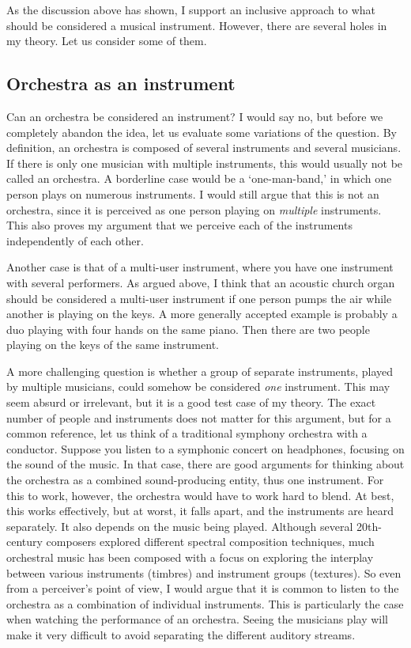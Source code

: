 As the discussion above has shown, I support an inclusive approach to what should be considered a musical instrument. However, there are several holes in my theory. Let us consider some of them.


\subsection{Orchestra as an instrument}\label{sec:orchestra}

Can an orchestra be considered an instrument? I would say no, but before we completely abandon the idea, let us evaluate some variations of the question. By definition, an orchestra is composed of several instruments and several musicians. If there is only one musician with multiple instruments, this would usually not be called an orchestra. A borderline case would be a `one-man-band,' in which one person plays on numerous instruments. I would still argue that this is not an orchestra, since it is perceived as one person playing on \emph{multiple} instruments. This also proves my argument that we perceive each of the instruments independently of each other.

Another case is that of a multi-user instrument, where you have one instrument with several performers. As argued above, I think that an acoustic church organ should be considered a multi-user instrument if one person pumps the air while another is playing on the keys. A more generally accepted example is probably a duo playing with four hands on the same piano. Then there are two people playing on the keys of the same instrument.

A more challenging question is whether a group of separate instruments, played by multiple musicians, could somehow be considered \emph{one} instrument. This may seem absurd or irrelevant, but it is a good test case of my theory. The exact number of people and instruments does not matter for this argument, but for a common reference, let us think of a traditional symphony orchestra with a conductor. Suppose you listen to a symphonic concert on headphones, focusing on the sound of the music. In that case, there are good arguments for thinking about the orchestra as a combined sound-producing entity, thus one instrument. For this to work, however, the orchestra would have to work hard to blend. At best, this works effectively, but at worst, it falls apart, and the instruments are heard separately. It also depends on the music being played. Although several 20th-century composers explored different spectral composition techniques, much orchestral music has been composed with a focus on exploring the interplay between various instruments (timbres) and instrument groups (textures). So even from a perceiver's point of view, I would argue that it is common to listen to the orchestra as a combination of individual instruments. This is particularly the case when watching the performance of an orchestra. Seeing the musicians play will make it very difficult to avoid separating the different auditory streams.

